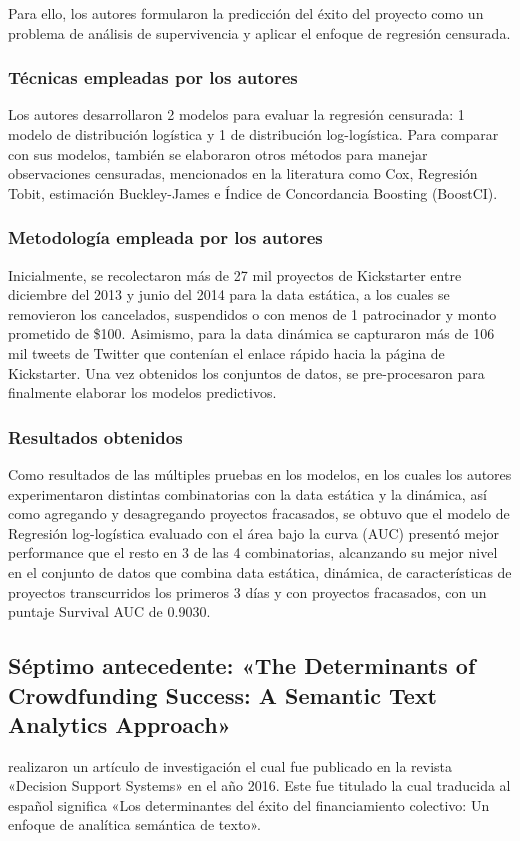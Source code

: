 Para ello, los autores formularon la predicción del éxito del proyecto como un problema de análisis de supervivencia y aplicar el enfoque de regresión censurada.

\subsubsection{Técnicas empleadas por los autores}
Los autores desarrollaron 2 modelos para evaluar la regresión censurada: 1 modelo de distribución logística y 1 de distribución log-logística. Para comparar con sus modelos, también se elaboraron otros métodos para manejar observaciones censuradas, mencionados en la literatura como Cox, Regresión Tobit, estimación Buckley-James e Índice de Concordancia Boosting (BoostCI).

\subsubsection{Metodología empleada por los autores}
Inicialmente, se recolectaron más de 27 mil proyectos de Kickstarter entre diciembre del 2013 y junio del 2014 para la data estática, a los cuales se removieron los cancelados, suspendidos o con menos de 1 patrocinador y monto prometido de \$100. Asimismo, para la data dinámica se capturaron más de 106 mil tweets de Twitter que contenían el enlace rápido hacia la página de Kickstarter. Una vez obtenidos los conjuntos de datos, se pre-procesaron para finalmente elaborar los modelos predictivos.

\subsubsection{Resultados obtenidos}
Como resultados de las múltiples pruebas en los modelos, en los cuales los autores experimentaron distintas combinatorias con la data estática y la dinámica, así como agregando y desagregando proyectos fracasados, se obtuvo que el modelo de Regresión log-logística evaluado con el área bajo la curva (AUC) presentó mejor performance que el resto en 3 de las 4 combinatorias, alcanzando su mejor nivel en el conjunto de datos que combina data estática, dinámica, de características de proyectos transcurridos los primeros 3 días y con proyectos fracasados, con un puntaje Survival AUC de 0.9030.

\subsection{Séptimo antecedente: «The Determinants of Crowdfunding Success: A Semantic Text Analytics Approach» \citep*{pr_yuan2016textanalytics}}
\citeauthor{pr_yuan2016textanalytics} realizaron un artículo de investigación el cual fue publicado en la revista «Decision Support Systems» en el año 2016. Este fue titulado  la cual traducida al español significa «Los determinantes del éxito del financiamiento colectivo: Un enfoque de analítica semántica de texto».

